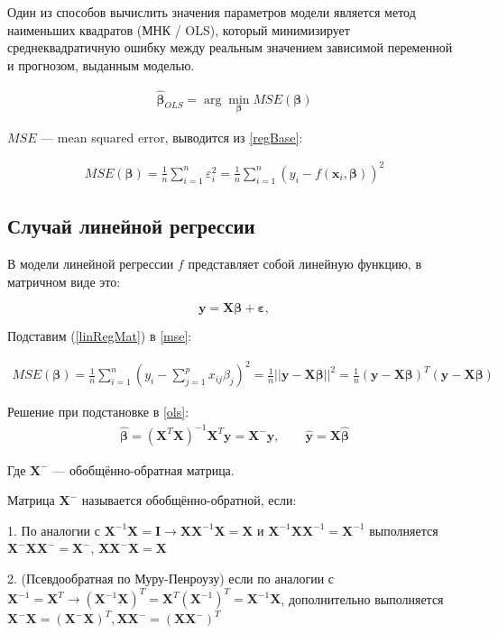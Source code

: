 \documentclass[12pt]{article}
\newcommand{\betah}{\hat{\bm \beta}}
\newcommand{\betaa}{\bm{\beta}}
\newcommand{\epss}{\bm{\varepsilon}}
\newcommand{\X}{\bm{X}}
\begin{document}
	Один из способов вычислить значения параметров модели является метод наименьших квадратов (МНК / OLS), который минимизирует среднеквадратичную ошибку между реальным значением зависимой переменной и прогнозом, выданным моделью.
	
	\begin{eqnarray}\label{ols}  
		\betah_{OLS} = \arg \min _{{\betaa}}MSE(\betaa)
	\end{eqnarray}
	
	$MSE$ --- mean squared error, выводится из \eqref{regBase}:
	
	\begin{eqnarray}\label{mse}  
		MSE(\betaa) = \frac{1}{n} \sum_{i = 1}^{n} \varepsilon_i^2 = \frac{1}{n} \sum_{i = 1}^{n}(y_i - f(\mathbf x_i, \betaa))^2
	\end{eqnarray}
	
	\subsection{Случай линейной регрессии}
	
	В модели линейной регрессии $f$ представляет собой линейную функцию, в матричном виде это:
	
	\begin{equation}\label{linRegMat}  
		\bm y = \X \betaa + \epss,
	\end{equation}
	
	Подставим (\ref{linRegMat}) в  \eqref{mse}:
	
	\begin{eqnarray}\label{linRegMSE} 
	MSE(\betaa) = \frac{1}{n} \sum_{i = 1}^{n}(y_i -\sum_{j = 1}^{p} x_{ij} \beta_j )^2 = \frac{1}{n} ||\bm y - \X \betaa||^2 = \frac{1}{n} (\bm y - \X \betaa)^T (\bm y - \X \betaa)
	\end{eqnarray}
	
	Решение при подстановке в \eqref{ols}:
	\begin{eqnarray}\label{linRegOLS}  
	\betah = (\X^T \X)^{-1} \X^{T} \bm y = \X^{-} \bm y,
	\qquad 
	\hat{\bm y} = \X \betah
	\end{eqnarray}
	
	
	Где $\X^{-}$ --- обобщённо-обратная матрица.
	
	Матрица $\X^{-}$ называется обобщённо-обратной, если:
	
	1. По аналогии с $\X^{-1}\X = \bm{I} \to \X\X^{-1}\X = \X$ и $\X^{-1}\X\X^{-1} = \X^{-1}$ выполняется $\X^{-}\X\X^{-} = \X^{-}$, $\X\X^{-}\X = \X$ 
	
	2. (Псевдообратная по Муру-Пенроузу) если по аналогии с $\X^{-1} = \X^{T}  \to (\X^{-1}\X)^T = \X^{T}(\X^{-1})^T = \X^{-1}\X$, дополнительно выполняется $\X^{-} \X = (\X^{-} \X)^T, \X \X^{-} = (\X \X^{-} )^T$	
	
\end{document}
